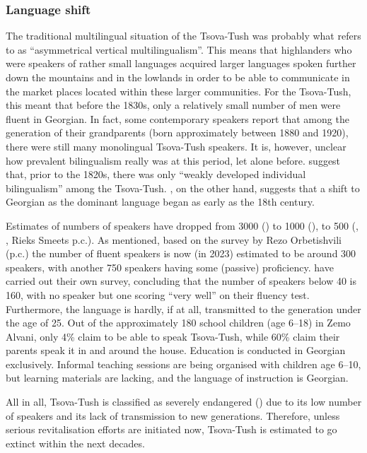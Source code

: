 \subsubsection{Language shift} \label{shift}



The traditional multilingual situation of the Tsova-Tush was probably what \textcite{nichols2013vertical} refers to as ``asymmetrical vertical multilingualism''. This means that highlanders who were speakers of rather small languages acquired larger languages spoken further down the mountains and in the lowlands in order to be able to communicate in the market places located within these larger communities. For the Tsova-Tush, this meant that before the 1830s, only a relatively small number of men were fluent in Georgian. In fact, some contemporary speakers report that among the generation of their grandparents (born approximately between 1880 and 1920), there were still many monolingual Tsova-Tush speakers. It is, however, unclear how prevalent bilingualism really was at this period, let alone before. \textcite[109]{gigashvilietal2020migration} suggest that, prior to the 1820s, there was only ``weakly developed individual bilingualism'' among the Tsova-Tush. \textcite{shanidze1970tush}, on the other hand, suggests that a shift to Georgian as the dominant language began as early as the 18th century.

Estimates of numbers of speakers have dropped from 3000 (\cites[]{holiskygagua}) to 1000 (\cites[]{gippert08}), to 500 (\cites[]{unesco,}, \cites[]{koryakov2002atlas}, Rieks Smeets p.c.). As mentioned, based on the survey by Rezo Orbetishvili (p.c.) the number of fluent speakers is now (in 2023) estimated to be around 300 speakers, with another 750 speakers having some (passive) proficiency. \textcite{gigashvili2014migration} have carried out their own survey, concluding that the number of speakers below 40 is 160, with no speaker but one scoring ``very well'' on their fluency test. Furthermore, the language is hardly, if at all, transmitted to the generation under the age of 25. Out of the approximately 180 school children (age 6--18) in Zemo Alvani, only 4\% claim to be able to speak Tsova-Tush, while 60\% claim their parents speak it in and around the house. Education is conducted in Georgian exclusively. Informal teaching sessions are being organised with children age 6--10, but learning materials are lacking, and the language of instruction is Georgian.  

All in all, Tsova-Tush is classified as severely endangered (\cites[]{unesco}) due to its low number of speakers and its lack of transmission to new generations. Therefore, unless serious revitalisation efforts are initiated now, Tsova-Tush is estimated to go extinct within the next decades.


